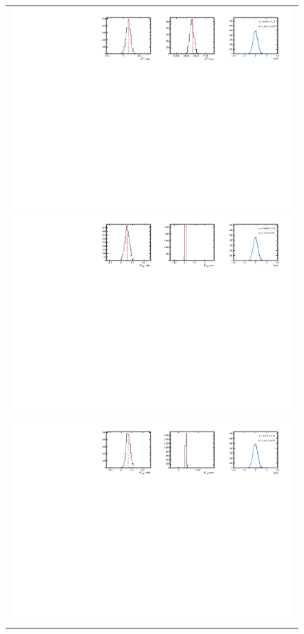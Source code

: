 \begin{figure}
  \centering
  \begin{tabular}{c}
\includegraphics[width=\textwidth]{ANA_resources/Plots/Data_fit/FitterBias//A_signal_Kpi.pdf} \\
\includegraphics[width=\textwidth]{ANA_resources/Plots/Data_fit/FitterBias//R_signal_piK_plus.pdf} \\
\includegraphics[width=\textwidth]{ANA_resources/Plots/Data_fit/FitterBias//R_signal_piK_minus.pdf} \\

\end{tabular}
\end{figure}
